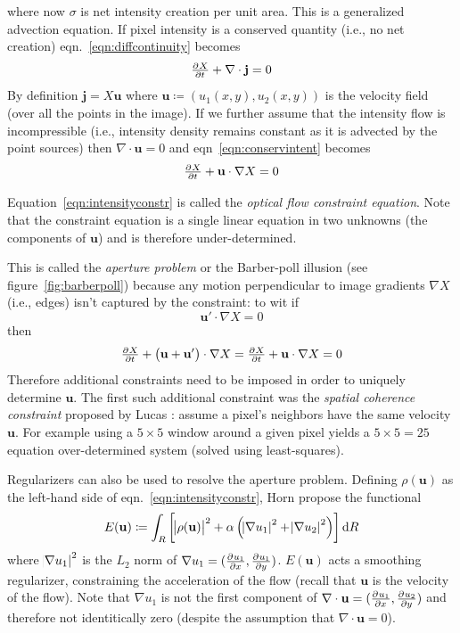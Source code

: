 where now \(\sigma\) is net intensity creation per unit area.
%
This is a generalized advection equation.
%
If pixel intensity is a conserved quantity (i.e., no net creation) eqn.~\eqref{eqn:diffcontinuity} becomes
\begin{equation}
	\pd{X}{t} + \nabla \cdot \mathbf{j} = 0
	\label{eqn:conservintent}
\end{equation}
By definition \(\mathbf{j} = X\mathbf{u}\) where \(\mathbf{u} \coloneqq (u_1(x,y), u_2(x,y))\) is the velocity field (over all the points in the image).
%
If we further assume that the intensity flow is incompressible (i.e., intensity density remains constant as it is advected by the point sources) then \(\nabla \cdot \mathbf{u} = 0\) and eqn~\eqref{eqn:conservintent} becomes
\begin{equation}
	\pd{X}{t} + \mathbf{u} \cdot \nabla X = 0
	\label{eqn:intensityconstr}
\end{equation}

Equation~\eqref{eqn:intensityconstr} is called the \textit{optical flow constraint equation}\cite{perez2013tv}.
%
Note that the constraint equation is a single linear equation in two unknowns (the components of \(\mathbf{u}\)) and is therefore under-determined.
%

%
This is called the \textit{aperture problem} or the Barber-poll illusion (see figure~\ref{fig:barberpoll}) because any motion perpendicular to image gradients \(\nabla X\) (i.e., edges) isn't captured by the constraint: to wit if 
\[\mathbf{u}' \cdot \nabla X= 0\] 
then 
\[
	\pd{X}{t} + \left(\mathbf{u} + \mathbf{u}' \right) \cdot \nabla X = \pd{X}{t} + \mathbf{u} \cdot \nabla X = 0
\]
%
Therefore additional constraints need to be imposed in order to uniquely determine \(\mathbf{u}\).
%
The first such additional constraint was the \textit{spatial coherence constraint} proposed by Lucas \etal\cite{lucas1981iterative}: assume a pixel's neighbors have the same velocity \(\mathbf{u}\).
%
For example using a \(5 \times 5\) window around a given pixel yields a \(5\times5 = 25\) equation over-determined system (solved using least-squares).

Regularizers can also be used to resolve the aperture problem. 
%
Defining \(\rho(\mathbf{u})\) as the left-hand side of eqn.~\eqref{eqn:intensityconstr}, Horn \etal\cite{horn1993determining} propose the functional
\begin{equation}
	E(\mathbf{u}) \coloneqq \int_R \left[ \abs{\rho(\mathbf{u})}^2 + \alpha \left( \abs{ \nabla u_1 }^2 + \abs{ \nabla u_2 }^2\right) \right] \dif R
	\label{eqn:linearhorn}
\end{equation}
where \(\abs{ \nabla u_1 }^2\) is the \(L_2\) norm of \(\nabla u_1 = (\pd{u_1}{x}, \pd{u_1}{y})\).
%
\(E(\mathbf{u})\) acts a smoothing regularizer, constraining the acceleration of the flow (recall that \(\mathbf{u}\) is the velocity of the flow).
%
Note that \(\nabla u_1\) is not the first component of \(\nabla \cdot \mathbf{u} = (\pd{u_1}{x}, \pd{u_2}{y})\) and therefore not identitically zero (despite the assumption that  \(\nabla \cdot \mathbf{u} = 0\)).

